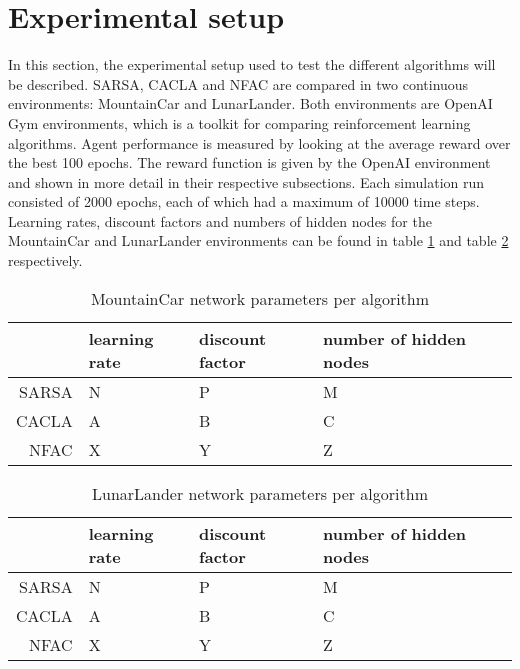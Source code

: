 
\section{Experimental setup}

In this section, the experimental setup used to test the different algorithms will be described. SARSA, CACLA and NFAC are compared in two continuous environments: MountainCar\cite{openaimountaincar} and LunarLander\cite{openailunarlander}. Both environments are OpenAI Gym environments\cite{openaigym}, which is a toolkit for comparing reinforcement learning algorithms.  Agent performance is measured by looking at the average reward over the best 100 epochs. The reward function is given by the OpenAI environment and shown in more detail in their respective subsections. Each simulation run consisted of 2000 epochs, each of which had a maximum of 10000 time steps. Learning rates, discount factors and numbers of hidden nodes for the MountainCar and LunarLander environments can be found in table \ref{tab:mntparam} and table \ref{tab:lunarparam} respectively. 

\begin{table}
\centering
\label{tab:mntparam}
\begin{tabular}{r|llll}
                     & learning rate & discount factor & number of hidden nodes \\\hline
SARSA & N          & P               & M         \\
CACLA & A          & B               & C         \\
NFAC    & X          & Y              & Z         
\end{tabular}
\caption{MountainCar network parameters per algorithm}
\end{table}

\begin{table}
\centering
\label{tab:lunarparam}
\begin{tabular}{r|llll}
                     & learning rate & discount factor & number of hidden nodes \\\hline
SARSA & N          & P               & M         \\
CACLA & A          & B               & C         \\
NFAC    & X          & Y              & Z         
\end{tabular}
\caption{LunarLander network parameters per algorithm}
\end{table}



